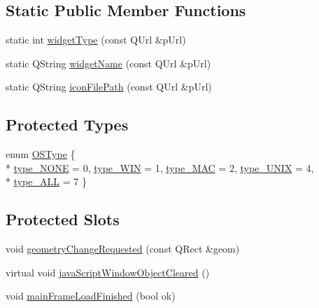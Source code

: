 \subsection*{Static Public Member Functions}
\begin{DoxyCompactItemize}
\item 
static int \hyperlink{class_u_b_graphics_widget_item_a46a579811500ea552463543435ff1198}{widget\-Type} (const Q\-Url \&p\-Url)
\item 
static Q\-String \hyperlink{class_u_b_graphics_widget_item_a4ff59ee71d509e240c1368f21ef6e311}{widget\-Name} (const Q\-Url \&p\-Url)
\item 
static Q\-String \hyperlink{class_u_b_graphics_widget_item_a09904301830055140477650fd7215061}{icon\-File\-Path} (const Q\-Url \&p\-Url)
\end{DoxyCompactItemize}
\subsection*{Protected Types}
\begin{DoxyCompactItemize}
\item 
enum \hyperlink{class_u_b_graphics_widget_item_a17550a6a5e78c02a5f45d7225357743a}{O\-S\-Type} \{ \\*
\hyperlink{class_u_b_graphics_widget_item_a17550a6a5e78c02a5f45d7225357743aa04ba9bb6747a460a2dbfbdb8e741fa5a}{type\-\_\-\-N\-O\-N\-E} =  0, 
\hyperlink{class_u_b_graphics_widget_item_a17550a6a5e78c02a5f45d7225357743aa788535a54c5f3fe87f339f4f9b031f25}{type\-\_\-\-W\-I\-N} =  1, 
\hyperlink{class_u_b_graphics_widget_item_a17550a6a5e78c02a5f45d7225357743aa1b9f5a643990a03e025c8d02376d30c8}{type\-\_\-\-M\-A\-C} =  2, 
\hyperlink{class_u_b_graphics_widget_item_a17550a6a5e78c02a5f45d7225357743aadd427ff45766cd8bfa3c1cb4d24ba99c}{type\-\_\-\-U\-N\-I\-X} =  4, 
\\*
\hyperlink{class_u_b_graphics_widget_item_a17550a6a5e78c02a5f45d7225357743aa68b98f9eb93f84a2404c3fa1ff39247c}{type\-\_\-\-A\-L\-L} =  7
 \}
\end{DoxyCompactItemize}
\subsection*{Protected Slots}
\begin{DoxyCompactItemize}
\item 
void \hyperlink{class_u_b_graphics_widget_item_ae6bb466f06a63f8c45e487e8984e7074}{geometry\-Change\-Requested} (const Q\-Rect \&geom)
\item 
virtual void \hyperlink{class_u_b_graphics_widget_item_a0adf0fa0da7fc994caa113f7d4a23ed3}{java\-Script\-Window\-Object\-Cleared} ()
\item 
void \hyperlink{class_u_b_graphics_widget_item_af915a16e794c31017fd82348894971f3}{main\-Frame\-Load\-Finished} (bool ok)
\end{DoxyCompactItemize}
